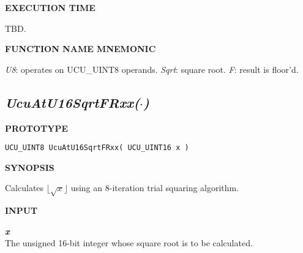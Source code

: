 \noindent\textbf{EXECUTION TIME}
\begin{list}{}{\setlength{\leftmargin}{0.25in}\setlength{\topsep}{0.0in}}
\item TBD.
\end{list}
\vspace{2.8ex}

\noindent\textbf{FUNCTION NAME MNEMONIC}
\begin{list}{}{\setlength{\leftmargin}{0.25in}\setlength{\topsep}{0.0in}}
\item \emph{U8}:   operates on UCU\_UINT8 operands.
      \emph{Sqrt}: square root.
      \emph{F}:    result is floor'd.
\end{list}


\subsection[\emph{UcuAtU16SqrtFRxx(\protect\mbox{\protect$\cdot$})}]
           {\emph{UcuAtU16SqrtFRxx(\protect\mbox{\protect\boldmath $\cdot$})}}
\label{cafn0:ssre0:suee1}

%

\noindent\textbf{PROTOTYPE}
\begin {list}{}{\setlength{\leftmargin}{0.25in}\setlength{\topsep}{0.0in}}
\item
\begin{verbatim}
UCU_UINT8 UcuAtU16SqrtFRxx( UCU_UINT16 x )
\end{verbatim}
\end{list}
\vspace{2.8ex}

\noindent\textbf{SYNOPSIS}
\begin{list}{}{\setlength{\leftmargin}{0.25in}\setlength{\topsep}{0.0in}}
\item
Calculates $\lfloor \sqrt{x} \rfloor$ using an 8-iteration
trial squaring algorithm.
\end{list}
\vspace{2.8ex}

\noindent\textbf{INPUT}
\begin{list}{}{\setlength{\leftmargin}{0.5in}\setlength{\itemindent}{-0.25in}\setlength{\topsep}{0.0in}\setlength{\partopsep}{0.0in}}
\item \emph{\textbf{x}}\\
      The unsigned 16-bit integer whose square root is to be calculated.
\end{list}
\vspace{2.8ex}

